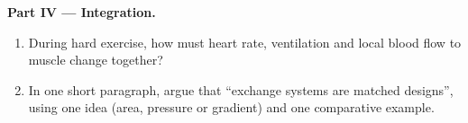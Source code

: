 \begin{problem}
\medskip
\noindent\textbf{Part IV --- Integration.}
\begin{enumerate}[resume]
  \item During hard exercise, how must heart rate, ventilation and
        local blood flow to muscle change together?
  \item In one short paragraph, argue that ``exchange systems are
        matched designs'', using one  idea (area, pressure
        or gradient) and one comparative example.
\end{enumerate}
\end{problem}
